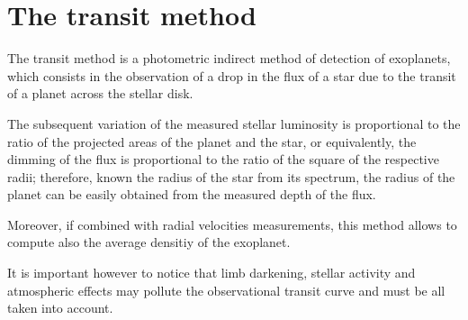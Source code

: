 \documentclass[a4paper,11pt,twocolumn]{article}
\begin{document}




\section{The transit method }

The transit method is a photometric indirect method of detection of exoplanets, which consists in the observation of a drop in the flux of a star due to the transit of a planet across the stellar disk. 

The subsequent variation of the measured stellar luminosity is proportional to the ratio of the projected areas of the planet and the star, or equivalently, the dimming of the flux is proportional to the ratio of the square of the respective radii; therefore, known the radius of the star from its spectrum, the radius of the planet can be easily obtained from the measured depth of the flux.

Moreover, if combined with radial velocities measurements, this method allows to compute also the average densitiy of the exoplanet.

It is important however to notice that limb darkening, stellar activity and atmospheric effects may pollute the observational transit curve and must be all taken into account.
\end{document}
